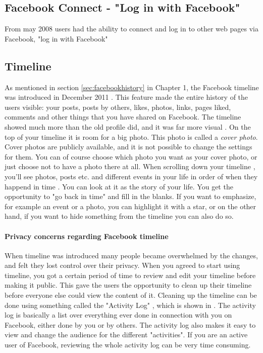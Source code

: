 \subsection{Facebook Connect - "Log in with Facebook"}
From may 2008 users had the ability to connect and log in to other web pages via Facebook, "log in with Facebook" 


\subsection{Timeline}
As mentioned in section \ref{sec:facebookhistory} in Chapter 1, the Facebook timeline was introduced in December 2011 \cite{EvolutionOfFacebook}. This feature made the entire history of the users visible: your posts, posts by others, likes, photos, links, pages liked, comments and other things that you have shared on Facebook. The timeline showed much more than the old profile did, and it was far more visual \cite{timeline}. On the top of your timeline it is room for a big photo. This photo is called a \emph{cover photo}. Cover photos are publicly available, and it is not possible to change the settings for them. You can of course choose which photo you want as your cover photo, or just choose not to have a photo there at all. When scrolling down your timeline , you'll see photos, posts etc. and different events in your life in order of when they happend in time \cite{timeline}. You can look at it as the story of your life. You get the opportunity to "go back in time" and fill in the blanks. If you want to emphasize, for example an event or a photo, you can highlight it with a star, or on the other hand, if you want to hide something from the timeline you can also do so. 

\paragraph{Privacy concerns regarding Facebook timeline}
When timeline was introduced many people became overwhelmed by the changes, and felt they lost control over their privacy. When you agreed to start using timeline, you got a certain period of time to review and edit your timeline before making it public. This gave the users the opportunity to clean up their timeline before everyone else could view the content of it. Cleaning up the timeline can be done using something called the "Activity Log" \cite{activitylog}, which is shown in . The activity log is basically a list over everything ever done in connection with you on Facebook, either done by you or by others. The activity log also makes it easy to view and change the audience for the different "activities". If you are an active user of Facebook, reviewing the whole activity log can be very time consuming. 


